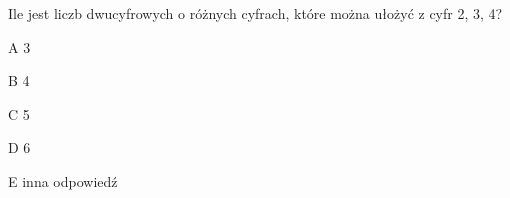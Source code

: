 \begin{tresc}
Ile jest liczb dwucyfrowych o różnych cyfrach, które można ułożyć z cyfr 2, 3, 4?
\end{tresc}
\begin{wariant}{A} 3 \end{wariant}
\begin{wariant}{B} 4 \end{wariant}
\begin{wariant}{C} 5 \end{wariant}
\begin{wariant}{D} 6 \end{wariant}
\begin{wariant}{E} inna odpowiedź \end{wariant}
